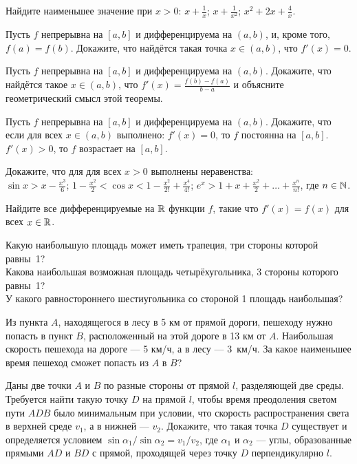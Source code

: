 \documentclass[a4paper,11pt]{article}
\begin{document}
 Найдите наименьшее значение %
при $x>0$:
 $x+\frac{1}{x}$;
 $x+\frac{1}{x^2}$;
 $x^2+2x+\frac{4}{x}$.

Пусть $f$ непрерывна на $[a,b]$  и дифференцируема на $(a,b)$,
и, кроме того, $f(a)=f(b)$. Докажите, что найд\"ется такая точка $x\in
(a,b)$, что $f'(x)=0$.

  
Пусть $f$ непрерывна на $[a,b]$  и дифференцируема на $(a,b)$.
Докажите, что найд\"ется такое $x\in (a,b)$, что
$f'(x)=\frac{f(b)-f(a)}{b-a}$ и
объясните геометрический смысл этой теоремы. %

Пусть $f$ непрерывна на $[a,b]$  и дифференцируема на $(a,b)$.
Докажите, что если для всех $x\in (a,b)$ выполнено:
 $f'(x)=0$, то $f$ постоянна
на $[a,b]$.
 $f'(x)>0$,
то $f$ возрастает на $[a,b]$.

 Докажите, что для для всех $x>0$ выполнены неравенства:\\
 $\sin x>x-\frac{x^3}{6}$;
 $1-\frac{x^2}{2}<\cos x<1-\frac{x^2}{2!}+\frac{x^4}{4!}$;
 $e^x>1+x+\frac{x^2}{2}+\ldots +\frac{x^n}{n!}$, где $n\in \mathbb{N}$.

 Найдите все дифференцируемые на $\mathbb{R}$ функции $f$, такие что
$f'(x)=f(x)$ для всех $x\in \mathbb{R}$.




 Какую наибольшую площадь может иметь трапеция,
три стороны которой равны~1?\\
 Какова наибольшая возможная площадь %
четыр\"ехугольника, 3 стороны которого равны~1?\\
 У какого равностороннего шестиугольника со стороной 1 %
площадь наибольшая?

Из пункта $A$, находящегося в лесу в 5 км от прямой
дороги, пешеходу нужно попасть в пункт $B$, расположенный
на  этой дороге в 13 км от $A$.
Наибольшая скорость пешехода на дороге --- 5 км/ч, а в лесу --- 3~км/ч.
За какое наименьшее время пешеход сможет попасть из $A$ в $B$?

Даны две точки $A$ и $B$ по разные стороны от прямой $l$, разделяющей
две среды. Требуется найти такую точку $D$ на прямой $l$,
чтобы время преодоления
светом пути $ADB$ было минимальным при условии, что скорость распространения
света в верхней среде $v_1$, а в нижней --- $v_2$.
Докажите, что такая точка $D$ существует и определяется условием
$\sin\alpha_1/\sin\alpha_2=v_1/v_2$, где $\alpha_1$ и $\alpha_2$ ---
углы, образованные прямыми $AD$ и $BD$ с прямой, проходящей через точку
$D$ перпендикулярно $l$.
\end{document}
